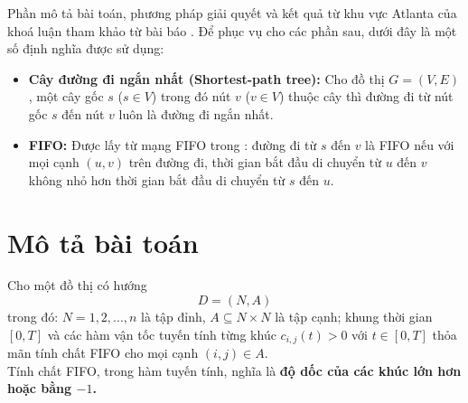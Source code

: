 \documentclass[../main.tex]{subfiles}
\begin{document}

Phần mô tả bài toán, phương pháp giải quyết và kết quả từ khu vực Atlanta của khoá luận 
tham khảo từ bài báo \cite{he2022dynamic}.
Để phục vụ cho các phần sau, dưới đây là một số định nghĩa được sử dụng: 
\begin{itemize}
  \item \textbf{Cây đường đi ngắn
nhất (Shortest-path tree):} Cho đồ thị \(G=(V,E)\), một cây gốc \(s\)
(\(s\in V\)) trong đó nút \(v\) (\(v\in V\)) thuộc cây thì đường đi từ
nút gốc \(s\) đến nút \(v\) luôn là đường đi ngắn nhất.
  \item \textbf{FIFO:} 
  Được lấy từ mạng FIFO trong \cite{dean2004shortest}: 
  đường đi từ \(s\) đến \(v\) là FIFO nếu với mọi cạnh \((u, v)\) trên đường đi, 
  thời gian bắt đầu di chuyển từ \(u\) đến \(v\) không nhỏ hơn thời gian bắt đầu di chuyển 
  từ \(s\) đến \(u\).
\end{itemize}

\section{Mô tả bài toán}\label{problem-description}

Cho một đồ thị có hướng 
\[
  D = (N, A)
\] 
trong đó: \(N = {1, 2, ..., n}\)
là tập đỉnh, \(A \subseteq N \times N\) là tập cạnh; khung thời gian
\([0, T]\) và các hàm vận tốc tuyến tính từng khúc
\(c_{i,j}(t) > 0\) với \(t \in [0, T]\) thỏa mãn tính chất FIFO cho mọi
cạnh \((i, j) \in A\).\\
Tính chất FIFO, trong hàm tuyến tính, nghĩa là
\textbf{độ dốc của các khúc lớn hơn hoặc bằng \(-1\).} 
\end{document}
